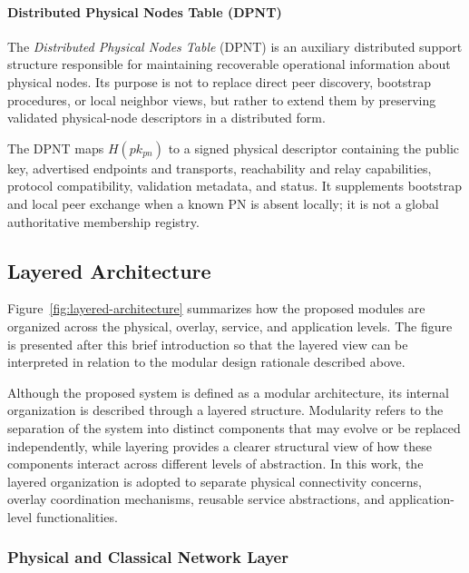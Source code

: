 \documentclass[12pt,a4paper]{article}
\begin{document}
\paragraph{Distributed Physical Nodes Table (DPNT)}

The \textit{Distributed Physical Nodes Table} (DPNT) is an auxiliary distributed support structure responsible for maintaining recoverable operational information about physical nodes. Its purpose is not to replace direct peer discovery, bootstrap procedures, or local neighbor views, but rather to extend them by preserving validated physical-node descriptors in a distributed form.

The DPNT maps $H(pk_{pn})$ to a signed physical descriptor containing the public key, advertised endpoints and transports, reachability and relay capabilities, protocol compatibility, validation metadata, and status. It supplements bootstrap and local peer exchange when a known PN is absent locally; it is not a global authoritative membership registry.



\subsection{Layered Architecture}

Figure~\ref{fig:layered-architecture} summarizes how the proposed modules are organized across the physical, overlay, service, and application levels. The figure is presented after this brief introduction so that the layered view can be interpreted in relation to the modular design rationale described above.

\thesislayerstikz

Although the proposed system is defined as a modular architecture, its internal organization is described through a layered structure. Modularity refers to the separation of the system into distinct components that may evolve or be replaced independently, while layering provides a clearer structural view of how these components interact across different levels of abstraction. In this work, the layered organization is adopted to separate physical connectivity concerns, overlay coordination mechanisms, reusable service abstractions, and application-level functionalities.

\subsubsection{Physical and Classical Network Layer}
\end{document}
